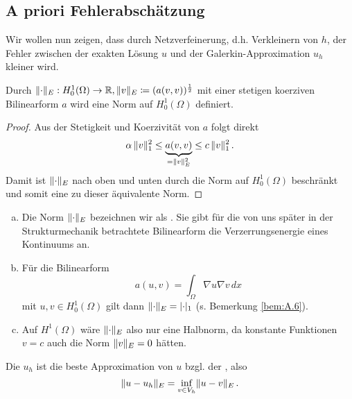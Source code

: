 \subsection{A priori Fehlerabschätzung}
\label{kap:2.3.1}

Wir wollen nun zeigen, dass durch Netzverfeinerung, d.h. Verkleinern von $h$, der Fehler zwischen der exakten Lösung $u$ und der Galerkin-Approximation $u_h$ kleiner wird.

\begin{lemma}\label{lem:2.27}
Durch $\lVert \cdot\rVert _E: H^1_0(\Omega) \rightarrow \mathbb{R}, \lVert v\rVert_E \coloneqq (a(v,v))^{\frac 1 2}$ mit einer stetigen koerziven Bilinearform $a$ wird eine Norm auf $H_0^1(\Omega)$ definiert.
\end{lemma}

\begin{proof}
Aus der Stetigkeit und Koerzivität von $a$ folgt direkt
\begin{align}\label{eq:2.12}
	\alpha \, \lVert v\rVert_1^2 \le \underbrace{a(v,v)}_{= \lVert v\rVert_E^2} \le c \, \lVert v\rVert_1^2 \, .
\end{align}
Damit ist $\lVert \cdot\rVert_E$ nach oben und unten durch die Norm auf $H^1_0(\Omega)$ beschränkt und somit eine zu dieser äquivalente Norm.
\end{proof}


\begin{bem*}
\begin{enumerate}[(a)]
\item Die Norm $\lVert \cdot\rVert_E$ bezeichnen wir als \textit{}. Sie gibt für die von uns später in der Strukturmechanik betrachtete Bilinearform  die Verzerrungsenergie eines Kontinuums an.
\item Für die Bilinearform
\[
	a(u,v) = \int_\Omega \nabla u \nabla v \, dx
\]
mit $u,v \in H^1_0(\Omega)$ gilt dann $\lVert \cdot\rVert_E = \lvert \cdot\rvert_1$ (s. Bemerkung \ref{bem:A.6}).
\item Auf $H^1(\Omega)$ wäre $\lVert \cdot\rVert_E$ also nur eine Halbnorm, da konstante Funktionen $v = c$ auch die Norm $\lVert v\rVert_E = 0$ hätten.
\end{enumerate}
\end{bem*}


\begin{satz}\label{satz:2.28}
Die  $u_h$ ist die beste Approximation von $u$ bzgl. der , also
\[
	\lVert u-u_h\rVert_E = \inf_{v \in V_h} \lVert u-v\rVert_E \, .
\]
\end{satz}

